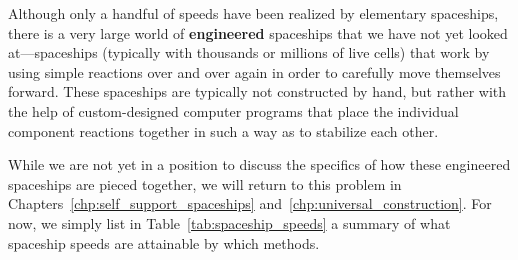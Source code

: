 Although only a handful of speeds have been realized by elementary spaceships, there is a very large world of \textbf{engineered} spaceships that we have not yet looked at---spaceships (typically with thousands or millions of live cells) that work by using simple reactions over and over again in order to carefully move themselves forward. These spaceships are typically not constructed by hand, but rather with the help of custom-designed computer programs that place the individual component reactions together in such a way as to stabilize each other.

While we are not yet in a position to discuss the specifics of how these engineered spaceships are pieced together, we will return to this problem in Chapters~\ref{chp:self_support_spaceships} and~\ref{chp:universal_construction}. For now, we simply list in Table~\ref{tab:spaceship_speeds} a summary of what spaceship speeds are attainable by which methods.

